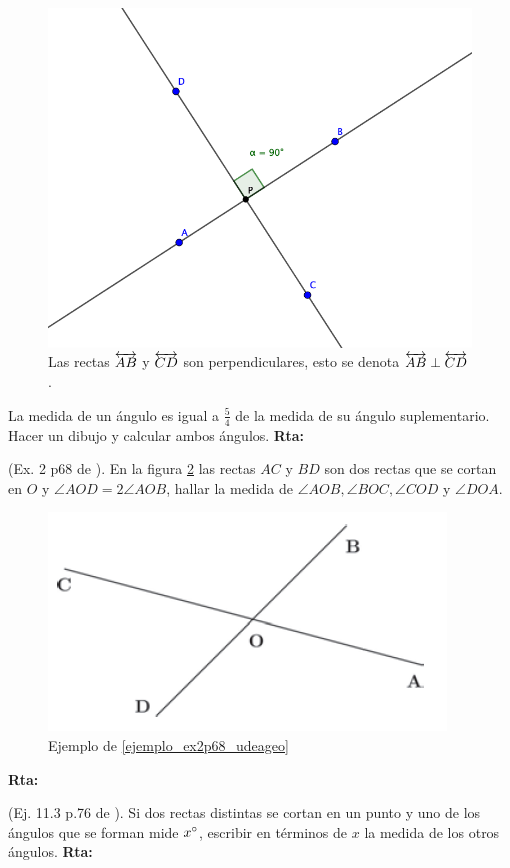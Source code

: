 \begin{itemize}
	\begin{figure}[H]
		\centering
		\includegraphics[width=0.5\linewidth]{Geometria/imgs/rectasperpendiculares}
		\caption{Las rectas $\protect \overleftrightarrow{AB}$ y $\protect\overleftrightarrow{CD}$ son perpendiculares, esto se denota $\protect\overleftrightarrow{AB}\protect\perp \protect\overleftrightarrow{CD}$.}
		\label{rectasperpendiculares}
	\end{figure}
	
\end{itemize}

\begin{ejemplo}
	La medida de un ángulo es igual a $\frac{5}{4}$ de la medida de su ángulo suplementario. Hacer un dibujo y calcular ambos ángulos.
	\textbf{Rta:} 
\end{ejemplo}

\begin{ejemplo} \label{ejemplo_ex2p68_udeageo}
	(Ex. 2 p68 de \cite{Udea_geometria}). En la figura \ref{ex2p68udeageo} las rectas $AC$ y $BD$ son dos rectas que se cortan en $O$ y $\angle AOD= 2\angle AOB$, hallar la medida de $\angle AOB, \angle BOC, \angle COD$ y $\angle DOA$.
	
	\begin{figure}[H]
		\centering
		\includegraphics[width=0.5\linewidth]{Geometria/imgs/Ex2_p68_Udea_geo}
		\caption{Ejemplo de \ref{ejemplo_ex2p68_udeageo}}
		\label{ex2p68udeageo}
	\end{figure}
	\textbf{Rta:} 
\end{ejemplo}

\begin{ejemplo}\label{ejemplo_ej11_3_p76_udeageo}
	(Ej. 11.3 p.76 de \cite{Udea_geometria}).
	Si dos rectas distintas se cortan en un punto y uno de los ángulos que se forman mide $x\degree$, escribir en términos de $x$ la medida de los otros ángulos.
	\textbf{Rta:} 
\end{ejemplo}

